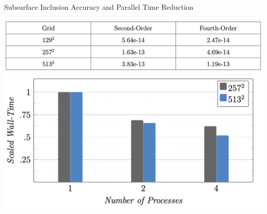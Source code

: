 \documentclass[handout]{beamer}
\begin{document}

\begin{frame}{Subsurface Inclusion Accuracy and Parallel Time Reduction}
\begin{center}
\includegraphics[scale=.35]{images/inc_acc}\\
\includegraphics[scale=.45]{images/inc_scale}
\end{center}
\end{frame}
\end{document}

